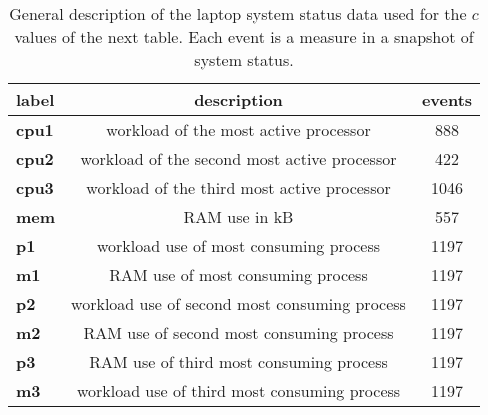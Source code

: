 \begin{table}[h!]
\begin{center}
\begin{tabular}{| l || c | c |}\hline
label & description & events \\\hline\hline
{\bf cpu1} & workload of the most active processor & 888 \\\hline
{\bf cpu2} & workload of the second most active processor & 422 \\\hline
{\bf cpu3} & workload of the third most active processor & 1046 \\\hline
{\bf mem} & RAM use in kB & 557 \\\hline
{\bf p1} & workload use of most consuming process & 1197 \\\hline
{\bf m1} & RAM use of most consuming process & 1197 \\\hline
{\bf p2} & workload use of second most consuming process & 1197 \\\hline
{\bf m2} & RAM use of second most consuming process & 1197 \\\hline
{\bf p3} & RAM use of third most consuming process & 1197 \\\hline
{\bf m3} & workload use of third most consuming process & 1197 \\\hline
\end{tabular}
\caption{General description of the laptop system status data used for the $c$ values of the next table. Each event is a measure in a snapshot of system status.}
\end{center}
\end{table}